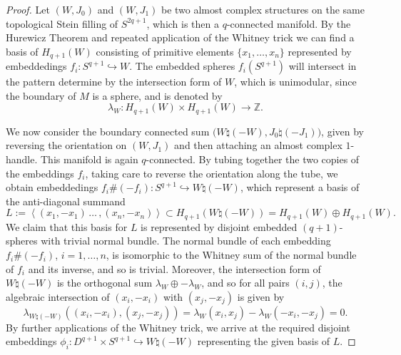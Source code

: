 \documentclass[12pt]{amsart}
\newcommand\Z{\mathbb{Z}}
\theoremstyle{remark}
\begin{document}
\begin{proof}
Let $(W,J_0)$ and $(W,J_1)$ be two almost complex structures on the same topological Stein filling of $S^{2q{+}1}$, which is then a $q$-connected manifold. By the Hurewicz Theorem and repeated application of the Whitney trick we can find a basis of $H_{q{+}1}(W)$ consisting of primitive elements
$\{ x_1, \dots, x_n \}$ represented by embeddedings $f_i \colon S^{q{+}1} \hookrightarrow W$.  
The embedded spheres $f_i(S^{q{+}1})$
will intersect in the pattern determine by the intersection form of $W$,
which is unimodular, since the boundary of $M$ is a sphere, and is denoted by
%
\[ \lambda_W \colon H_{q{+}1}(W) \times H_{q{+}1}(W) \to \Z.\]
%

We now consider the boundary connected sum 
$\big( W\natural(-W), J_0\natural(-J_1) \bigr)$, 
given by reversing the orientation on $(W, J_1)$ and then 
attaching an almost complex $1$-handle.  This manifold is again
$q$-connected. By tubing together the two copies of the embeddings $f_i$,
taking care to reverse the orientation along the tube,
we obtain embeddedings $f_i \# (-f_i) \colon S^{q{+}1} \hookrightarrow W \natural (-W)$,
which represent a basis of the anti-diagonal summand
%
%
\[ L := \left\langle (x_1, -x_1) \, \dots\,, (x_n, -x_n) \right\rangle
\subset H_{q{+}1}(W\natural(-W)) = H_{q+1}(W) \oplus H_{q+1}(W). \]
%
We claim that this basis for $L$ is represented by disjoint embedded $(q{+}1)$-spheres
with trivial normal bundle.  The normal bundle of each embedding $f_i \# (-f_i)$,
$i = 1, \dots, n$, is isomorphic to the Whitney
sum of the normal bundle of $f_i$ and its inverse, and so is trivial.
Moreover, the intersection form of $W \natural (-W)$ is the orthogonal sum 
$\lambda_W \oplus -\lambda_W$, and so for all pairs $(i, j)$, 
the algebraic intersection of $(x_i, -x_i)$ with $(x_j, -x_j)$ is given by
%
\[ \lambda_{W \natural (-W)}((x_i, -x_i), (x_j, -x_j))
= \lambda_W(x_i, x_j) - \lambda_W(-x_i, -x_j) = 0 .\]
%
By further applications of the Whitney trick, we arrive at the required
disjoint embeddings 
$\phi_i \colon D^{q{+}1} \times S^{q{+}1} \hookrightarrow W \natural (-W)$ 
representing the given basis of $L$.


\end{proof}
\end{document}
